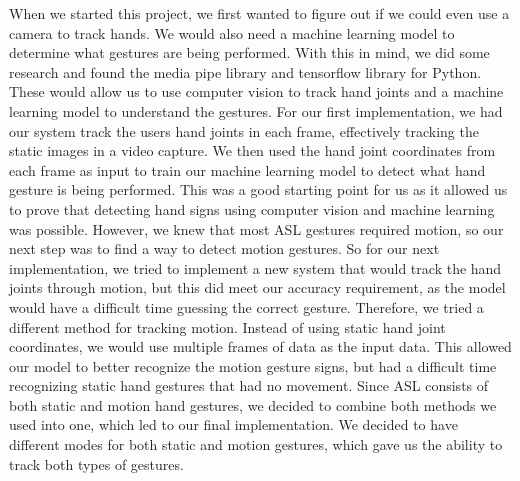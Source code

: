 \documentclass[12pt, titlepage]{article}
\begin{document}
When we started this project, we first wanted to figure out if we could even use a camera to track hands. We would also need a machine learning model to determine what gestures are being performed. With this in mind, we did some research and found the media pipe library and tensorflow library for Python. These would allow us to use computer vision to track hand joints and a machine learning model to understand the gestures. For our first implementation, we had our system track the users hand joints in each frame, effectively tracking the static images in a video capture. We then used the hand joint coordinates from each frame as input to train our machine learning model to detect what hand gesture is being performed. This was a good starting point for us as it allowed us to prove that detecting hand signs using computer vision and machine learning was possible. However, we knew that most ASL gestures required motion, so our next step was to find a way to detect motion gestures. So for our next implementation, we tried to implement a new system that would track the hand joints through motion, but this did meet our accuracy requirement, as the model would have a difficult time guessing the correct gesture. Therefore, we tried a different method for tracking motion. Instead of using static hand joint coordinates, we would use multiple frames of data as the input data. This allowed our model to better recognize the motion gesture signs, but had a difficult time recognizing static hand gestures that had no movement. Since ASL consists of both static and motion hand gestures, we decided to combine both methods we used into one, which led to our final implementation. We decided to have different modes for both static and motion gestures, which gave us the ability to track both types of gestures.\\
\end{document}
